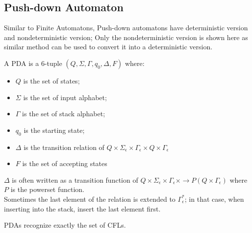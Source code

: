 \documentclass{report}
\begin{document}
		\subsection{Push-down Automaton}
			Similar to Finite Automatons, Push-down automatons have deterministic version and nondeterministic version; Only the nondeterministic version is shown here as similar method can be used to convert it into a deterministic version.
			\begin{defn} \label{def_pda} %
				A PDA is a 6-tuple $(Q,\Sigma,\Gamma,q_0,\Delta,F)$ where:
				\begin{itemize}
					\item $Q$ is the set of states;
					\item $\Sigma$ is the set of input alphabet;
					\item $\Gamma$ is the set of stack alphabet;
					\item $q_0$ is the starting state;
					\item $\Delta$ is the transition relation of $Q \times \Sigma_\epsilon \times \Gamma_\epsilon \times Q \times \Gamma_\epsilon$
					\item $F$ is the set of accepting states
				\end{itemize}
				$\Delta$ is often written as a transition function of $Q \times \Sigma_\epsilon \times \Gamma_\epsilon \times \rightarrow P(Q \times \Gamma_\epsilon)$ where $P$ is the powerset function.\\
				Sometimes the last element of the relation is extended to $\Gamma_\epsilon^*$; in that case, when inserting into the stack, insert the last element first.
			\end{defn}
			
			\begin{thm} \label{thm_PDA_CFL}
				PDAs recognize exactly the set of CFLs.
			\end{thm}
		
\end{document}
